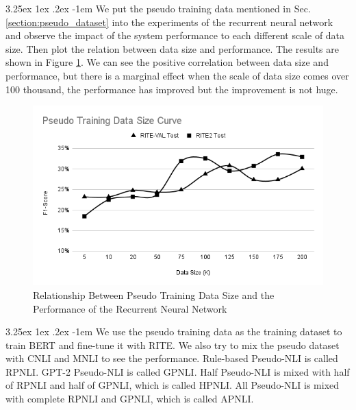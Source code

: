 \documentclass[12pt]{article}
\makeatletter
\renewcommand\paragraph{\@startsection{paragraph}{5}{\z@}%
  {3.25ex \@plus1ex \@minus.2ex}%
  {-1em}%
  {\normalfont\normalsize\bfseries}}
\makeatother
\begin{document}
\begin{CJK*}{UTF8}{bkai}
\begin{spacing}{1.77}
\paragraph{}
We put the pseudo training data mentioned in Sec. \ref{section:pseudo_dataset} into the experiments of the recurrent neural network and observe the impact of the system performance to each different scale of data size. Then plot the relation between data size and performance. The results are shown in Figure \ref{fig:pseudo_datasize}. We can see the positive correlation between data size and performance, but there is a marginal effect when the scale of data size comes over 100 thousand, the performance has improved but the improvement is not huge.

\begin{figure}[H]
  \centering
  \includegraphics[width=15cm]{PseudoTrainingDataSizeCurve.png}
  \caption{Relationship Between Pseudo Training Data Size and the Performance of the Recurrent Neural Network}
  \label{fig:pseudo_datasize}
\end{figure}

\paragraph{}
We use the pseudo training data as the training dataset to train BERT and fine-tune it with RITE. We also try to mix the pseudo dataset with CNLI and MNLI to see the performance. Rule-based Pseudo-NLI is called RPNLI. GPT-2 Pseudo-NLI is called GPNLI. Half Pseudo-NLI is mixed with half of RPNLI and half of GPNLI, which is called HPNLI. All Pseudo-NLI is mixed with complete RPNLI and GPNLI, which is called APNLI.


\end{spacing}
\end{CJK*}
\end{document}
